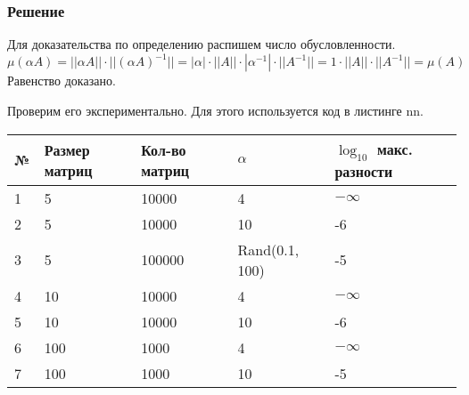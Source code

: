         \subsubsection{Решение}
            Для доказательства по определению распишем число обусловленности.
            \[
                \mu(\alpha A) = ||\alpha A|| \cdot || (\alpha A)^{-1} || = |\alpha| \cdot ||A|| \cdot |\alpha^{-1}| \cdot || A^{-1} || = 1 \cdot ||A|| \cdot ||A^{-1}|| = \mu(A) 
            \]
            Равенство доказано. 
            
            Проверим его экспериментально. Для этого используется код в листинге nn.
    
            \noindent
            \begin{tabular}{| l | l | l | l | l |}
                \hline
                № & Размер матриц & Кол-во матриц & $ \alpha $ & $\log_{10}$ макс. разности \\ \hline
                1 & 5 & 10000 & 4 & $ -\infty $ \\ \hline
                2 & 5 & 10000 & 10 & -6 \\ \hline
                3 & 5 & 100000 & Rand(0.1, 100) & -5 \\ \hline
                4 & 10 & 10000 & 4 & $ -\infty $ \\ \hline
                5 & 10 & 10000 & 10 & -6 \\ \hline
                6 & 100 & 1000 & 4 & $ -\infty $ \\ \hline
                7 & 100 & 1000 & 10 & -5 \\ \hline
                  
            \end{tabular}    
            
